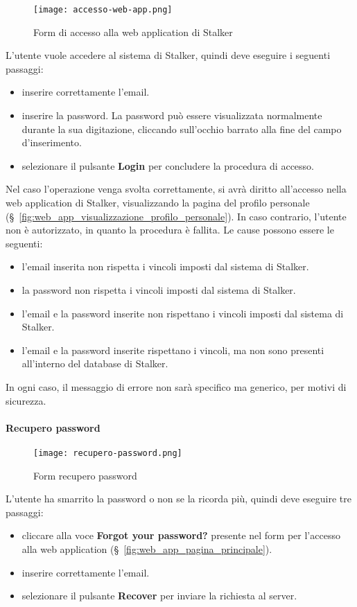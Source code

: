 \documentclass[../manuale-utente.tex]{subfiles}
\begin{document}
\begin{figure}[H]
    \centering
    \texttt{[image: accesso-web-app.png]}
    \caption{Form di accesso alla web application di Stalker}%
    \label{fig:web_app_form_accesso}
\end{figure}
L'utente vuole accedere al sistema di Stalker, quindi deve eseguire i seguenti passaggi:
\begin{itemize}
    \item inserire correttamente l'email.
    \item inserire la password. La password può essere visualizzata normalmente durante la sua digitazione, cliccando sull'occhio barrato alla fine del campo d'inserimento.
    \item selezionare il pulsante \textbf{Login} per concludere la procedura di accesso.
\end{itemize}
Nel caso l'operazione venga svolta correttamente, si avrà diritto all'accesso nella web application di Stalker, visualizzando la pagina del profilo personale (§~\ref{fig:web_app_visualizzazione_profilo_personale}).
In caso contrario, l'utente non è autorizzato, in quanto la procedura è fallita.
Le cause possono essere le seguenti:
\begin{itemize}
    \item l'email inserita non rispetta i vincoli imposti dal sistema di Stalker.
    \item la password non rispetta i vincoli imposti dal sistema di Stalker.
    \item l'email e la password inserite non rispettano i vincoli imposti dal sistema di Stalker.
    \item l'email e la password inserite rispettano i vincoli, ma non sono presenti all'interno del database di Stalker.
\end{itemize}
In ogni caso, il messaggio di errore non sarà specifico ma generico, per motivi di sicurezza.

\paragraph{Recupero password}%
\label{par:recupero_password}

\begin{figure}[H]
    \centering
    \texttt{[image: recupero-password.png]}
    \caption{Form recupero password}%
    \label{fig:web_app_form_recupero_password}
\end{figure}
L'utente ha smarrito la password o non se la ricorda più, quindi deve eseguire tre passaggi:
\begin{itemize}
    \item cliccare alla voce \textbf{Forgot your password?} presente nel form per l'accesso alla web application (§~\ref{fig:web_app_pagina_principale}).
    \item inserire correttamente l'email.
    \item selezionare il pulsante \textbf{Recover} per inviare la richiesta al server.
\end{itemize}
\end{document}
